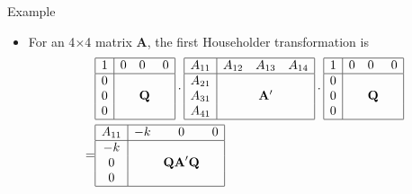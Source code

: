 \documentclass{beamer}
\begin{document}
\begin{frame}{Example}
    \begin{itemize}
        \item For an 4$\times$4 matrix $\mathbf{A}$, the first Householder transformation is
        \begin{align*}
            &\begin{array}{|l|lll|}
            \hline 1 & 0 & 0 & 0 \\
            \hline 0 & & & \\
            0 & & \mathbf{Q} & \\
            0 & & & \\
            \hline
            \end{array}\cdot \begin{array}{|c|ccc|}
            \hline A_{11} & A_{12} & A_{13} & A_{14} \\
            \hline A_{21} & & & \\
            A_{31} & & \mathbf{A}^{\prime} & \\
            A_{41} & & & \\
            \hline
            \end{array} \cdot
            \begin{array}{|l|lll|}
            \hline 1 & 0 & 0 & 0 \\
            \hline 0 & & & \\
            0 & & \mathbf{Q} & \\
            0 & & & \\
            \hline
            \end{array}\\
            =& \begin{array}{|c|ccc|}
                \hline A_{11} & -k & 0 & 0 \\
                \hline-k & & & \\
                0 & & \mathbf{Q A}^{\prime} \mathbf{Q} & \\
                0 & & & \\
                \hline
                \end{array}
            \end{align*}
    \end{itemize}
\end{frame}
\end{document}

